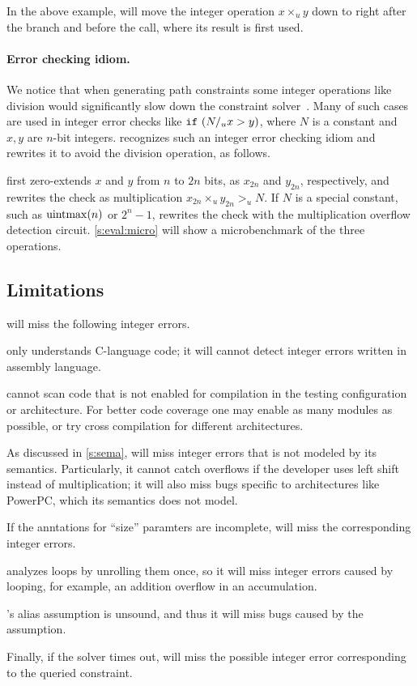 In the above example, \sys will move the integer operation $x
\times_u y$ down to right after the  branch and before the
 call, where its result  is first used.

\paragraph{Error checking idiom.}

We notice that when generating path constraints some integer
operations like division would significantly slow down the constraint
solver~\cite{brummayer:perf}.  Many of such cases are used in integer
error checks like $\texttt{if}\ (N /_u x > y)$, where $N$ is a constant
and $x, y$ are $n$-bit integers.  \sys recognizes such an integer
error checking idiom and rewrites it to avoid the division operation,
as follows.

\sys first zero-extends $x$ and $y$ from $n$ to $2n$ bits, as
$x_{2n}$ and $y_{2n}$, respectively, and rewrites the check as
multiplication $x_{2n} \times_u y_{2n} >_u N$.  If $N$ is a special
constant, such as $\operatorname{uintmax}(n)$ or $2^n-1$, \sys rewrites the check
with the multiplication overflow detection circuit.
%
\autoref{s:eval:micro} will show a microbenchmark of the three
operations.

\subsection{Limitations}
\label{s:gen:limit}

\sys will miss the following integer errors.

\sys only understands C-language code; it will cannot detect integer
errors written in assembly language.

\sys cannot scan code that is not enabled for compilation in the
testing configuration or architecture.  For better code coverage
one may enable as many modules as possible, or try cross compilation
for different architectures.

As discussed in \autoref{s:sema}, \sys will miss integer errors
that is not modeled by its semantics.  Particularly, it cannot catch
overflows if the developer uses left shift instead of multiplication;
it will also miss bugs specific to architectures like PowerPC, which
its semantics does not model.

If the anntations for ``size'' paramters are incomplete, \sys will
miss the corresponding integer errors.

\sys analyzes loops by unrolling them once, so it will miss integer
errors caused by looping, for example, an addition overflow in an
accumulation.

\sys's alias assumption is unsound, and thus it will miss bugs
caused by the assumption.

Finally, if the solver times out, \sys will miss the possible integer
error corresponding to the queried constraint.
